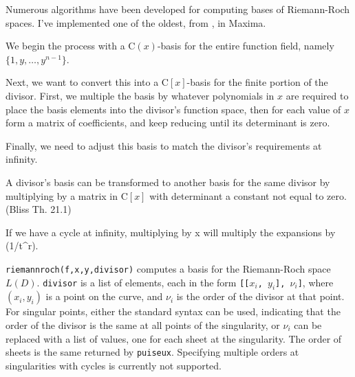 Numerous algorithms have been developed for computing bases
of Riemann-Roch spaces.  I've implemented one of the oldest,
from \cite{bliss}, in Maxima.

We begin the process with a ${\mathrm C}(x)$-basis for the entire
function field, namely $\{1, y, \ldots, y^{n-1}\}$.

Next, we want to convert this into a ${\mathrm C}[x]$-basis for the
finite portion of the divisor.  First, we multiple the basis by
whatever polynomials in $x$ are required to place the basis elements
into the divisor's function space, then for each value of $x$ form
a matrix of coefficients, and keep reducing until its determinant is zero.

Finally, we need to adjust this basis to match the divisor's requirements at infinity.

A divisor's basis can be transformed to another basis for the same
divisor by multiplying by a matrix in ${\mathrm C}[x]$ with
determinant a constant not equal to zero. (Bliss Th. 21.1)

If we have a cycle at infinity, multiplying by x will multiply
the expansions by (1/t^r).

{\tt riemannroch(f,x,y,divisor)} computes a basis for the Riemann-Roch
space $L(D)$.  {\tt divisor} is a list of elements, each in the form
{\tt [[$x_i$, $y_i$], $\nu_i$]}, where $(x_i, y_i)$ is a point on the
curve, and $\nu_i$ is the order of the divisor at that point.  For
singular points, either the standard syntax can be used, indicating
that the order of the divisor is the same at all points of the
singularity, or $\nu_i$ can be replaced with a list of values, one for
each sheet at the singularity.  The order of sheets is the same
returned by {\tt puiseux}.  Specifying multiple orders at
singularities with cycles is currently not supported.

